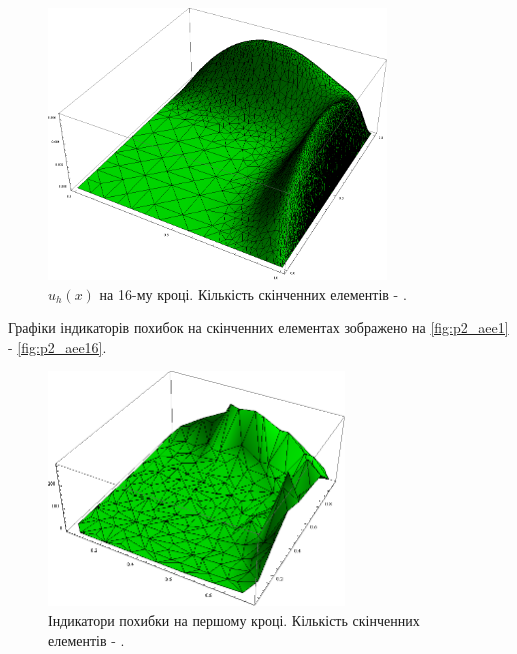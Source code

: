 \begin{figure}[H]
	\centering
    \includegraphics[width=0.8\textwidth]{problem2/my/solutions/solution16}
    \caption{$u_h(x)$ на 16-му кроці. Кількість скінченних елементів - .}
    \label{fig:p2_solution16}
\end{figure}

\clearpage
Графіки індикаторів похибок на скінченних елементах зображено на \autoref{fig:p2_aee1} - \autoref{fig:p2_aee16}.

\begin{figure}[H]
	\centering
    \includegraphics[width=0.7\textwidth]{problem2/my/AEE/aee1}
    \caption{Індикатори похибки на першому кроці. Кількість скінченних елементів - .}
    \label{fig:p2_aee1}
\end{figure}

